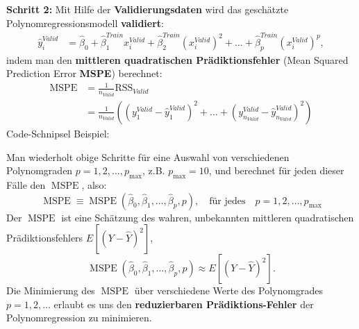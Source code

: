 \documentclass[
  ngerman,
]{book}
\newenvironment{Shaded}{\begin{snugshade}}{\end{snugshade}}
\newcommand{\AttributeTok}[1]{\textcolor[rgb]{0.77,0.63,0.00}{#1}}
\newcommand{\DecValTok}[1]{\textcolor[rgb]{0.00,0.00,0.81}{#1}}
\newcommand{\FunctionTok}[1]{\textcolor[rgb]{0.00,0.00,0.00}{#1}}
\newcommand{\NormalTok}[1]{#1}
\newcommand{\OtherTok}[1]{\textcolor[rgb]{0.56,0.35,0.01}{#1}}
\newcommand{\SpecialCharTok}[1]{\textcolor[rgb]{0.00,0.00,0.00}{#1}}
\begin{document}
\textbf{Schritt 2:} Mit Hilfe der \textbf{Validierungsdaten} wird das geschätzte Polynomregressionsmodell \textbf{validiert}:
\begin{align*}
\hat{y}^{Valid}_i
&=\hat{\beta}_0 + \hat{\beta}_1^{Train} x_{i}^{Valid} + \hat{\beta}_2^{Train} (x_{i}^{Valid})^2 + \dots + \hat{\beta}_p^{Train} (x_{i}^{Valid})^p,
\end{align*}
indem man den \textbf{mittleren quadratischen Prädiktionsfehler} (Mean Squared Prediction Error \textbf{MSPE}) berechnet:
\begin{align*}
\text{MSPE}
&=\frac{1}{n_{Valid}}\text{RSS}_{Valid}\\
&=\frac{1}{n_{Valid}}\left((y_1^{Valid} - \hat{y}_1^{Valid})^2 +\dots + (y_{n_{Valid}}^{Valid} - \hat{y}_{n_{Valid}}^{Valid})^2\right)
\end{align*}
Code-Schnipsel Beispiel:

\begin{Shaded}
\end{Shaded}

Man wiederholt obige Schritte für eine Auswahl von verschiedenen Polynomgraden \(p=1,2,\dots,p_{\max}\), z.B. \(p_{\max}=10\), und berechnet für jeden dieser Fälle den \(\operatorname{MSPE}\), also:
\[
\operatorname{MSPE}\equiv\operatorname{MSPE}(\hat{\beta}_0, \hat{\beta}_1, \dots, \hat{\beta}_p,p),\quad\text{für jedes}\quad p=1,2,\dots,p_{\max}
\]
Der \(\operatorname{MSPE}\) ist eine Schätzung des wahren, unbekannten mittleren quadratischen Prädiktionsfehlers \(E\left[(Y-\hat{Y})^2\right]\),\\
\[
\operatorname{MSPE}(\hat{\beta}_0, \hat{\beta}_1, \dots, \hat{\beta}_p,p)\approx E\left[(Y-\hat{Y})^2\right]. 
\]
Die Minimierung des \(\operatorname{MSPE}\) über verschiedene Werte des Polynomgrades \(p=1,2,\dots\) erlaubt es uns den \textbf{reduzierbaren Prädiktions-Fehler} der Polynomregression zu minimieren.
\end{document}
